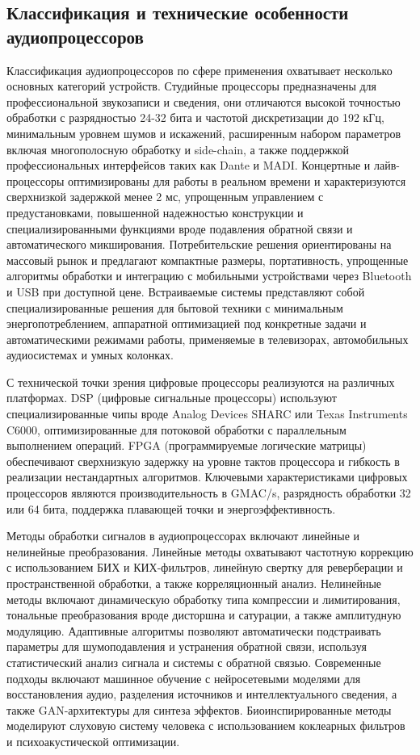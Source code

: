 \subsection{Классификация и технические особенности аудиопроцессоров}
Классификация аудиопроцессоров по сфере применения охватывает несколько основных категорий устройств. Студийные процессоры предназначены для профессиональной звукозаписи и сведения, они отличаются высокой точностью обработки с разрядностью 24-32 бита и частотой дискретизации до 192 кГц, минимальным уровнем шумов и искажений, расширенным набором параметров включая многополосную обработку и side-chain, а также поддержкой профессиональных интерфейсов таких как Dante и MADI. Концертные и лайв-процессоры оптимизированы для работы в реальном времени и характеризуются сверхнизкой задержкой менее 2 мс, упрощенным управлением с предустановками, повышенной надежностью конструкции и специализированными функциями вроде подавления обратной связи и автоматического микширования. Потребительские решения ориентированы на массовый рынок и предлагают компактные размеры, портативность, упрощенные алгоритмы обработки и интеграцию с мобильными устройствами через Bluetooth и USB при доступной цене. Встраиваемые системы представляют собой специализированные решения для бытовой техники с минимальным энергопотреблением, аппаратной оптимизацией под конкретные задачи и автоматическими режимами работы, применяемые в телевизорах, автомобильных аудиосистемах и умных колонках.

С технической точки зрения цифровые процессоры реализуются на различных платформах. DSP (цифровые сигнальные процессоры) используют специализированные чипы вроде Analog Devices SHARC или Texas Instruments C6000, оптимизированные для потоковой обработки с параллельным выполнением операций. FPGA (программируемые логические матрицы) обеспечивают сверхнизкую задержку на уровне тактов процессора и гибкость в реализации нестандартных алгоритмов. Ключевыми характеристиками цифровых процессоров являются производительность в GMAC/s, разрядность обработки 32 или 64 бита, поддержка плавающей точки и энергоэффективность.

Методы обработки сигналов в аудиопроцессорах включают линейные и нелинейные преобразования. Линейные методы охватывают частотную коррекцию с использованием БИХ и КИХ-фильтров, линейную свертку для реверберации и пространственной обработки, а также корреляционный анализ. Нелинейные методы включают динамическую обработку типа компрессии и лимитирования, тональные преобразования вроде дисторшна и сатурации, а также амплитудную модуляцию. Адаптивные алгоритмы позволяют автоматически подстраивать параметры для шумоподавления и устранения обратной связи, используя статистический анализ сигнала и системы с обратной связью. Современные подходы включают машинное обучение с нейросетевыми моделями для восстановления аудио, разделения источников и интеллектуального сведения, а также GAN-архитектуры для синтеза эффектов. Биоинспирированные методы моделируют слуховую систему человека с использованием коклеарных фильтров и психоакустической оптимизации.


